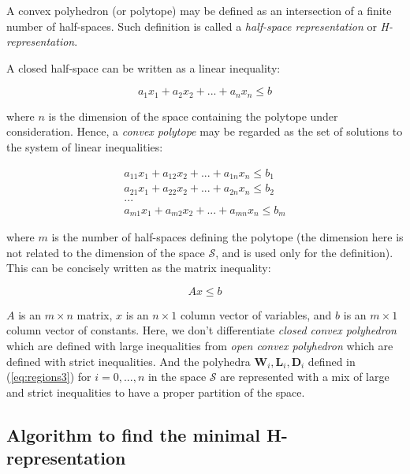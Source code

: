 \documentclass[11pt]{article}
\numberwithin{equation}{section}
\numberwithin{figure}{section}
\numberwithin{table}{section}
\begin{document}
A convex polyhedron (or polytope) may be defined as an intersection of a finite number of half-spaces. Such definition is called a \textit{half-space representation} or \textit{H-representation}.

\noindent A closed half-space can be written as a linear inequality:

\begin{equation}
a_{1}x_{1} + a_{2}x_{2} + ... + a_{n}x_{n} \leq b
\label{eq:closedHalfSpace}
\end{equation}

\noindent where $n$ is the dimension of the space containing the polytope under consideration. Hence, a \textit{convex polytope} may be regarded as the set of solutions to the system of linear inequalities:

\begin{equation}
\begin{array}{l}
a_{11}x_{1} + a_{12}x_{2} + ... + a_{1n}x_{n} \leq b_{1}\\
a_{21}x_{1} + a_{22}x_{2} + ... + a_{2n}x_{n} \leq b_{2}\\
...\\
a_{m1}x_{1} + a_{m2}x_{2} + ... + a_{mn}x_{n} \leq b_{m}
\end{array}
\label{eq:hRepresentation}
\end{equation}

\noindent where $m$ is the number of half-spaces defining the polytope (the dimension here is not related to the dimension of the space $\mathcal{S}$, and is used only for the definition). This can be concisely written as the matrix inequality:

\begin{equation}
Ax \leq b
\label{eq:matRepresentation}
\end{equation}

\noindent $A$ is an $m\times n$ matrix, $x$ is an $n\times 1$ column vector of variables, and $b$ is an $m\times 1$ column vector of constants. Here, we don't differentiate \textit{closed convex polyhedron} which are defined with large inequalities from \textit{open convex polyhedron} which are defined with strict inequalities. And the polyhedra $\textbf{W}_{i}, \textbf{L}_{i}, \textbf{D}_{i}$ defined in (\ref{eq:regions3}) for $i=0,...,n$ in the space $\mathcal{S}$ are represented with a mix of large and strict inequalities to have a proper partition of the space.


\subsection{Algorithm to find the minimal H-representation}\label{sec:minHrepresentation}
\end{document}
